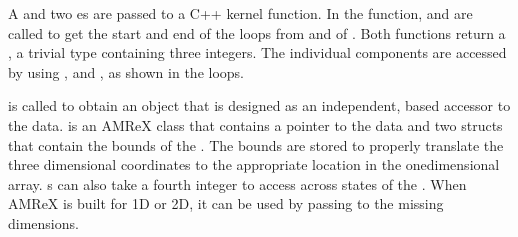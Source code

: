 \documentclass[letterpaper,10pt,english]{sphinxmanual}
\begin{document}
\begin{sphinxVerbatim}[commandchars=\\\{\}]
    
        
     \PYG{p}{[}\PYG{p}{]} \PYG{p}{[}\PYG{p}{]}
\end{sphinxVerbatim}

\sphinxAtStartPar
A  and two es are passed to a C++ kernel
function.  In the function,  and 
are called to get the start and end of the loops from 
and  of .  Both functions return a
, a trivial type containing three integers.
The individual components are accessed by using ,  and
, as shown in the  loops.

\sphinxAtStartPar
{} is called to obtain an  object that is
designed as an independent,  based accessor to the
 data.  is an AMReX class that contains a
pointer to the  data and two  structs that
contain the bounds of the .  The bounds are stored to
properly translate the three dimensional coordinates to the appropriate
location in the one\sphinxhyphen{}dimensional array.  \textquotesingle{}s 
can also take a fourth integer to access across states of the
.  When AMReX is built for 1D or 2D, it can be used
by passing  to the missing dimensions.
\end{document}
